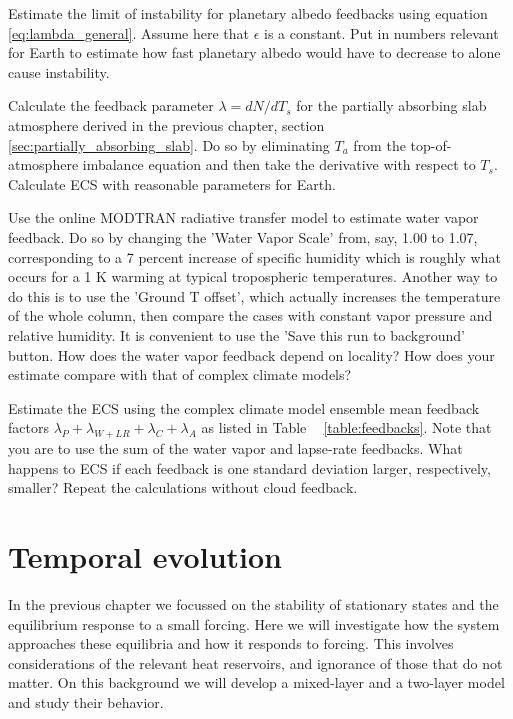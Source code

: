 \documentclass[12pt]{book}
\begin{document}
\newpage
\vspace{1 cm}
{\setlength{\parindent}{0cm}
\begin{exercise}
Estimate the limit of instability for planetary albedo feedbacks using equation \ref{eq:lambda_general}.  Assume here that $\epsilon$ is a constant. Put in numbers relevant for Earth to estimate how fast planetary albedo would have to decrease to alone cause instability.  
\end{exercise}

\begin{exercise}
Calculate the feedback parameter $\lambda = dN/dT_s$ for the partially absorbing slab atmosphere derived in the previous chapter, section \ref{sec:partially_absorbing_slab}. Do so by eliminating $T_a$ from the top-of-atmosphere imbalance equation and then take the derivative with respect to $T_s$. Calculate ECS with reasonable parameters for Earth.
\end{exercise}

\begin{exercise}
Use the online MODTRAN radiative transfer model to estimate water vapor feedback. Do so by changing the 'Water Vapor Scale' from, say, 1.00 to 1.07, corresponding to a 7 percent increase of specific humidity which is roughly what occurs for a 1 K warming at typical tropospheric temperatures. Another way to do this is to use the 'Ground T offset', which actually increases the temperature of the whole column, then compare the cases with constant vapor pressure and relative humidity. It is convenient to use the 'Save this run to background' button.
How does the water vapor feedback depend on locality? How does your estimate compare with that of complex climate models?
\end{exercise}

\begin{exercise}
Estimate the ECS using the complex climate model ensemble mean feedback factors $ \lambda_P + \lambda_{W+LR} + \lambda_C + \lambda_A$ as listed in Table $\ $ \ref{table:feedbacks}. Note that you are to use the sum of the water vapor and lapse-rate feedbacks. What happens to ECS if each feedback is one standard deviation larger, respectively, smaller? Repeat the calculations without cloud feedback. 
\end{exercise}

}


\chapter{Temporal evolution}
\label{chapter:evolution}
In the previous chapter we focussed on the stability of stationary states and the equilibrium response to a small forcing. Here we will investigate how the system approaches these equilibria and how it responds to forcing. This involves considerations of the relevant heat reservoirs, and ignorance of those that do not matter. On this background we will develop a mixed-layer and a two-layer model and study their behavior. 
\end{document}
